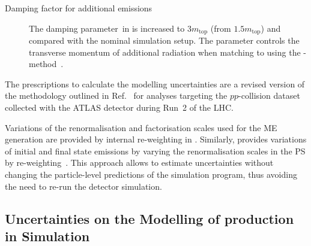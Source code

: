\begin{description}
\item[Damping factor for additional emissions] The damping parameter~\hdamp in
  \POWHEGBOX[v2] is increased to $3 m_\text{top}$ (from $1.5 m_\text{top}$) and
  compared with the nominal simulation setup. The \hdamp parameter controls the
  transverse momentum of additional radiation when matching \POWHEGBOX[v2] to
  \PYTHIA[8] using the
  \POWHEG-method~\cite{ATL-PHYS-PUB-2016-020,ATL-PHYS-PUB-2020-023}.

\end{description}
The prescriptions to calculate the \ttbar modelling uncertainties are a revised
version of the methodology outlined in Ref.~\cite{ATL-PHYS-PUB-2020-023} for
analyses targeting the $pp$-collision dataset collected with the ATLAS detector
during Run~2 of the LHC.


Variations of the renormalisation and factorisation scales used for the ME
generation are provided by internal re-weighting in \POWHEGBOX[v2]. Similarly,
\PYTHIA[8] provides variations of initial and final state emissions by varying
the renormalisation scales in the PS by
re-weighting~\cite{Mrenna:2016sih,pythia-variations-online}. This approach
allows to estimate uncertainties without changing the particle-level predictions
of the simulation program, thus avoiding the need to re-run the detector
simulation.



\subsection{Uncertainties on the Modelling of \Zjets production in Simulation}%
\label{app:zjets_uncertainties}

